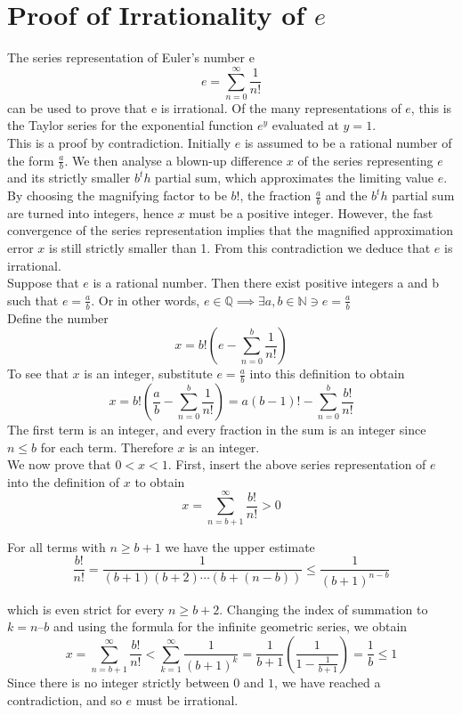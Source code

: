 \documentclass[10pt]{report}
\begin{document}
\section{Proof of Irrationality of $e$}
The series representation of Euler's number e
$$e = \sum_{n = 0}^{\infty}\frac{1}{n!}$$
can be used to prove that e is irrational. Of the many representations of $e$, this is the Taylor series for the exponential function $e^y$ evaluated at $y = 1$.\\
This is a proof by contradiction. Initially $e$ is assumed to be a rational number of the form $\frac{a}{b}$. We then analyse a blown-up difference $x$ of the series representing $e$ and its strictly smaller $b^th$ partial sum, which approximates the limiting value $e$. By choosing the magnifying factor to be $b!$, the fraction $\frac{a}{b}$ and the $b^th$ partial sum are turned into integers, hence $x$ must be a positive integer. However, the fast convergence of the series representation implies that the magnified approximation error $x$ is still strictly smaller than 1. From this contradiction we deduce that $e$ is irrational.\\
Suppose that $e$ is a rational number. Then there exist positive integers a and b such that $e =\frac{a}{b}$. Or in other words,  $e\in\mathbb{Q}\implies\exists a,b\in \mathbb{N}\ni e=\frac{a}{b}$\\
Define the number
$$x = b!\left(e - \sum_{n=0}^{b} \frac{1}{n!}\right)$$
To see that $x$ is an integer, substitute $e=\frac{a}{b}$ into this definition to obtain
$$x = b!\left(\frac{a}{b} - \sum_{n = 0}^{b}\frac{1}{n!}\right)=a (b - 1)! - \sum_{n = 0}^{b} \frac{b!}{n!}$$ 
The first term is an integer, and every fraction in the sum is an integer since $n\leq b$ for each term. Therefore $x$ is an integer.\\
We now prove that $0 < x < 1$. First, insert the above series representation of $e$ into the definition of $x$ to obtain
$$x = \sum_{n = b+1}^{\infty} \frac{b!}{n!}>0$$

For all terms with $n\geq {b + 1}$ we have the upper estimate
$$\frac{b!}{n!} =\frac{1}{(b+1)(b+2)\cdots(b+(n-b))} \leq\frac{1}{(b+1)^{n-b}}$$ 

which is even strict for every $n\geq b + 2$. Changing the index of summation to $k = n – b$ and using the formula for the infinite geometric series, we obtain
$$x =\sum_{n = b+1}^{\infty} \frac{b!}{n!} < \sum_{k=1}^{\infty}\frac{1}{(b+1)^k} =\frac{1}{b+1} \left(\frac{1}{1-\frac{1}{b+1}}\right) = \frac{1}{b} \leq 1$$
Since there is no integer strictly between $0$ and $1$, we have reached a contradiction, and so $e$ must be irrational.
\end{document}
